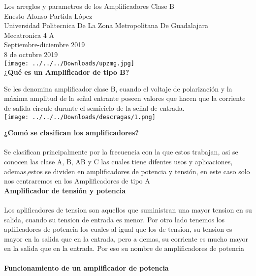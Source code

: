\documentclass[12pt]{report}
\begin{document}
{\Large Los arreglos y parametros de los Amplificadores Clase B}\\
\Large{Enesto Alonso Partida López\\ Universidad Politecnica De La Zona Metropolitana De Guadalajara\\ Mecatronica 4 A\\ Septiembre-diciembre 2019}\\
{8 de octubre 2019 }\\

\texttt{[image: ../../../Downloads/upzmg.jpg]} \\


\newpage
{\huge \textbf{¿Qué es un Amplificador de tipo B?}\\}

{\Large Se les denomina amplificador clase B, cuando el voltaje de polarización y la máxima amplitud de la señal entrante poseen valores que hacen que la corriente de salida circule durante el semiciclo de la señal de entrada.}\\
\texttt{[image: ../../../Downloads/descragas/1.png]}  

{\huge \textbf{¿Comó se clasifican los amplificadores?}\\}\\


{\Large Se clasifican principalmente por la frecuencia con la que estos trabajan, asi se conocen las clase A, B, AB y C las cuales tiene difentes usos y aplicaciones, ademas,estos se dividen en amplificadores de potencia y tensión, en este caso solo nos centraremos en los Amplificadores de tipo A}\\



{\huge \textbf{Amplificador de tensión y potencia}\\}\\


{\Large Los aplificadores de tension son aquellos que suministran una mayor tension en su salida, cuando su tension de entrada es menor. Por otro lado tenemos los aplificadores de potencia los cuales al igual que los de tension, su tension es mayor en la salida que en la entrada, pero a demas, su corriente es mucho mayor en la salida que en la entrada. Por eso su nombre de amplificadores de potencia }\\
\\
{\huge \textbf{Funcionamiento de un amplificador de potencia  }\\}\\
\end{document}
